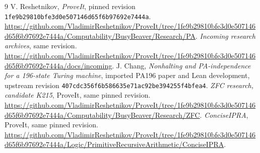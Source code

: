 \documentclass[11pt,a4paper]{article}
\newcommand{\file}[1]{\texttt{\nolinkurl{#1}}}
\newcommand{\pin}{\nolinkurl{1fe9b29810bfe3d0e507146d65f6b97692e7444a}}
\begin{document}
\begingroup\footnotesize\setlength{\parskip}{0pt}
\begin{thebibliography}{9}\setlength{\itemsep}{2pt}
 V. Reshetnikov, \emph{ProveIt}, pinned revision
\pin.\newline
\url{https://github.com/VladimirReshetnikov/ProveIt/tree/1fe9b29810bfe3d0e507146d65f6b97692e7444a/Computability/BusyBeaver/Research/PA}.
 \emph{Incoming research archives}, same revision.\newline
\url{https://github.com/VladimirReshetnikov/ProveIt/tree/1fe9b29810bfe3d0e507146d65f6b97692e7444a/docs/incoming}.
 J. Chang, \emph{Nonhalting and PA-independence for a
196-state Turing machine}, imported PA196 paper and Lean development,
upstream revision \file{407cdc356f6b586635e71ac92be394255f4bfea4}.
 \emph{ZFC research, candidate K215}, ProveIt, same pinned
revision.\newline
\url{https://github.com/VladimirReshetnikov/ProveIt/tree/1fe9b29810bfe3d0e507146d65f6b97692e7444a/Computability/BusyBeaver/Research/ZFC}.
 \emph{ConciseIPRA}, ProveIt, same pinned revision.\newline
\url{https://github.com/VladimirReshetnikov/ProveIt/tree/1fe9b29810bfe3d0e507146d65f6b97692e7444a/Logic/PrimitiveRecursiveArithmetic/ConciseIPRA}.
\end{thebibliography}
\endgroup
\end{document}
